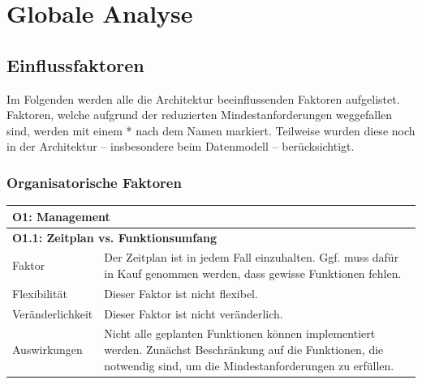 \documentclass[fontsize=12pt,paper=a4,twoside]{scrartcl}
\begin{document}
\section{Globale Analyse}
\label{sec:globale_analyse}

\subsection{Einflussfaktoren}
\label{sec:einflussfaktoren}

Im Folgenden werden alle die Architektur beeinflussenden Faktoren aufgelistet. Faktoren, welche aufgrund der reduzierten Mindestanforderungen weggefallen sind, werden mit einem * nach dem Namen markiert. Teilweise wurden diese noch in der Architektur -- insbesondere beim Datenmodell -- berücksichtigt.

\subsubsection{Organisatorische Faktoren}
\begin{tabularx}{\textwidth}{|l|X|}
\hline
\multicolumn{2}{|l|}{\textbf{O1: Management}}\\\hline
\multicolumn{2}{|l|}{\textbf{O1.1: Zeitplan vs. Funktionsumfang}}\\\hline
 Faktor & Der Zeitplan ist in jedem Fall einzuhalten. Ggf. muss dafür in Kauf genommen werden, dass gewisse Funktionen fehlen. \\\hline
 Flexibilität & Dieser Faktor ist nicht flexibel.\\\hline
 Veränderlichkeit & Dieser Faktor ist nicht veränderlich.\\\hline
 Auswirkungen & Nicht alle geplanten Funktionen können implementiert werden. Zunächst Beschränkung auf die Funktionen, die notwendig sind, um die Mindestanforderungen zu erfüllen.\\\hline
\end{tabularx}

\newpage
\end{document}
